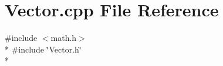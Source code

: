 \section{Vector.\-cpp File Reference}
\label{_vector_8cpp}
{\ttfamily \#include $<$math.\-h$>$}\\*
{\ttfamily \#include \char`\"{}Vector.\-h\char`\"{}}\\*
